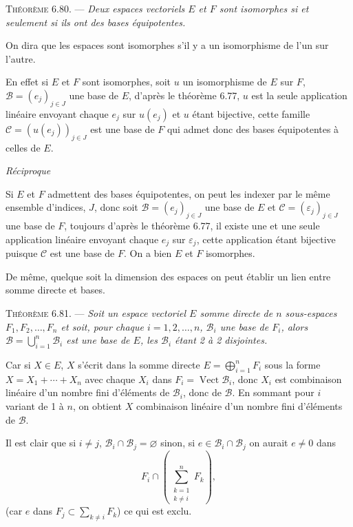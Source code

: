 \medskip\noindent\textsc{Théorème 6.80.} --- \emph{Deux espaces vectoriels $E$ et $F$ sont isomorphes si et seulement si ils ont des bases équipotentes.}

On dira que les espaces sont isomorphes s'il y a un isomorphisme de l'un sur l'autre.

En effet si $E$ et $F$ sont isomorphes, soit $u$ un isomorphisme de $E$ sur $F$, $\mathcal B=(e_j)_{j\in J}$ une base de $E$, d'après le théorème 6.77, $u$ est la seule application linéaire envoyant chaque $e_j$ sur $u(e_j)$  et $u$ étant bijective, cette famille $\mathcal C=(u(e_j))_{j\in J}$ est une base de $F$ qui admet donc des bases équipotentes à celles de $E$.

\emph{Réciproque}

Si $E$ et $F$ admettent des bases équipotentes, on peut les indexer par le même ensemble d'indices, $J$, donc soit $\mathcal B=(e_j)_{j\in J}$ une base de $E$ et $\mathcal C=(\varepsilon_j)_{j\in J}$ une base de $F$, toujours d'après le théorème 6.77, il existe une et une seule application linéaire envoyant chaque $e_j$ sur $\varepsilon_j$, cette application étant bijective puisque $\mathcal C$ est une base de $F$. On a bien $E$ et $F$ isomorphes. \bookend

De même, quelque soit la dimension des espaces on peut établir un lien entre somme directe et bases.

\medskip\noindent\textsc{Théorème 6.81.} --- \emph{Soit un espace vectoriel $E$ somme directe de $n$ sous-espaces $F_1,F_2,\ldots,F_n$ et soit, pour chaque $i=1,2,\ldots,n$, $\mathcal B_i$ une base de $F_i$, alors $\mathcal B=\bigcup_{i=1}^n\mathcal B_i$ est une base de $E$, les $\mathcal B_i$ étant 2 à 2 disjointes.}

Car si $X\in E$, $X$ s'écrit dans la somme directe $E=\bigoplus_{i=1}^n F_i$ sous la forme $X=X_1+\cdots+X_n$ avec chaque $X_i$ dans $F_i=\operatorname{Vect}\mathcal B_i$, donc $X_i$ est combinaison linéaire d'un nombre fini d'éléments de $\mathcal B_i$, donc de $\mathcal B$. En sommant pour $i$ variant de 1 à $n$, on obtient $X$ combinaison linéaire d'un nombre fini d'éléments de $\mathcal B$.

Il est clair que si $i\ne j$, $\mathcal B_i\cap\mathcal B_j=\varnothing$ sinon, si $e\in\mathcal B_i\cap\mathcal B_j$ on aurait $e\ne0$ dans
\[
F_i\cap\left(\sum_{\substack{k=1\\k\ne i}}^n F_k\right),
\]
(car $e$ dans $F_j\subset\sum_{k\ne i}F_k$) ce qui est exclu.

